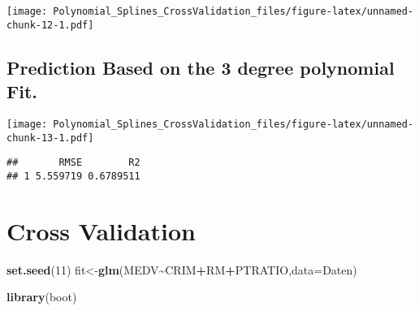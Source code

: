 \documentclass[
]{article}
\newenvironment{Shaded}{\begin{snugshade}}{\end{snugshade}}
\newcommand{\AttributeTok}[1]{\textcolor[rgb]{0.13,0.29,0.53}{#1}}
\newcommand{\CommentTok}[1]{\textcolor[rgb]{0.56,0.35,0.01}{\textit{#1}}}
\newcommand{\DecValTok}[1]{\textcolor[rgb]{0.00,0.00,0.81}{#1}}
\newcommand{\FunctionTok}[1]{\textcolor[rgb]{0.13,0.29,0.53}{\textbf{#1}}}
\newcommand{\NormalTok}[1]{#1}
\newcommand{\OtherTok}[1]{\textcolor[rgb]{0.56,0.35,0.01}{#1}}
\newcommand{\SpecialCharTok}[1]{\textcolor[rgb]{0.81,0.36,0.00}{\textbf{#1}}}
\begin{document}
\texttt{[image: Polynomial\_Splines\_CrossValidation\_files/figure-latex/unnamed-chunk-12-1.pdf]}

\hypertarget{prediction-based-on-the-3-degree-polynomial-fit.}{%
\subsection{Prediction Based on the 3 degree polynomial
Fit.}\label{prediction-based-on-the-3-degree-polynomial-fit.}}

\begin{Shaded}
\end{Shaded}

\texttt{[image: Polynomial\_Splines\_CrossValidation\_files/figure-latex/unnamed-chunk-13-1.pdf]}

\begin{Shaded}
\end{Shaded}

\begin{verbatim}
##       RMSE        R2
## 1 5.559719 0.6789511
\end{verbatim}

\hypertarget{cross-validation}{%
\section{Cross Validation}\label{cross-validation}}

\begin{Shaded}
\begin{Highlighting}[]
\FunctionTok{set.seed}\NormalTok{(}\DecValTok{11}\NormalTok{)}
\NormalTok{fit}\OtherTok{\textless{}{-}}\FunctionTok{glm}\NormalTok{(MEDV}\SpecialCharTok{\textasciitilde{}}\NormalTok{CRIM}\SpecialCharTok{+}\NormalTok{RM}\SpecialCharTok{+}\NormalTok{PTRATIO,}\AttributeTok{data=}\NormalTok{Daten)}

\FunctionTok{library}\NormalTok{(boot)}
\end{Highlighting}
\end{Shaded}
\end{document}
